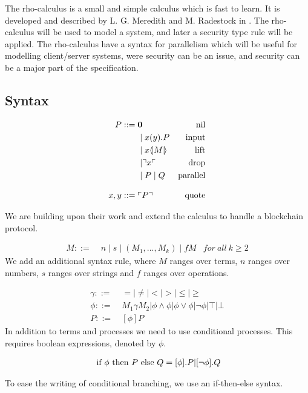 The rho-calculus is a small and simple calculus which is fast to learn.
It is developed and described by L. G. Meredith and M. Radestock in \citep{Meredith2005}.
The rho-calculus will be used to model a system, and later a security type rule will be applied.
The rho-calculus have a syntax for parallelism which will be useful for modelling client/server systems, were security can be an issue, and security can be a major part of the specification. 

\subsection{Syntax}
\begin{align*}
    P  ::= \; &  \mathbf{0} & \text{nil} \\
      & \mid x(y).P & \text{input} \\
      & \mid x \langle \! | M | \! \rangle & \text{lift} \\
      & \mid \urcorner x \ulcorner & \text{drop} \\
      & \mid P \mid Q & \text{parallel} \\[3mm]
    x,y ::= \; & \ulcorner P \urcorner & \text{quote}\\
\end{align*}

We are building upon their work and extend the calculus to handle a blockchain protocol.

\begin{align*}
M::=\; & n \mid s \mid (M_1,...,M_k) \mid fM &for\ all\ k \geq 2
\end{align*}
We add an additional syntax rule, where $M$ ranges over terms, $n$ ranges over numbers, $s$ ranges over strings and $f$ ranges over operations.

\begin{align*}
\gamma ::=& \ =|\neq|<|>|\leq|\geq\\
\phi ::=& \ M_1\gamma M_2|\phi\land\phi|\phi\lor\phi|\neg\phi|\top|\bot\\
P::=& \ [\phi] P
\end{align*}
In addition to terms and processes we need to use conditional processes. This requires boolean expressions, denoted by \ensuremath{\phi}.

\begin{align*}
	\text{ if }\phi\text{ then }P\text{ else }Q = [\phi].P | [\neg \phi].Q
\end{align*}

To ease the writing of conditional branching, we use an if-then-else syntax.